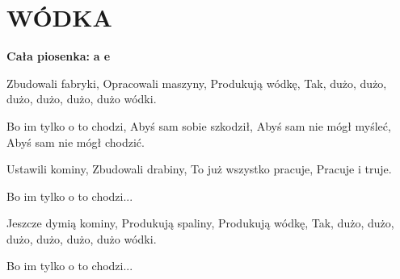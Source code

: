 \documentclass[../../../songbook.tex]{subfiles}
\begin{document}
\TabPositions{8cm} %
\section*{WÓDKA}
{}
\vspace{0.5cm}
\textbf{Cała piosenka: } {\color{red}\textbf{a e} } \newline

Zbudowali fabryki,		 \newline
Opracowali maszyny, \newline
Produkują wódkę, \newline
Tak, dużo, dużo, dużo, dużo, dużo, dużo wódki. \newline

\-\hspace{1cm} Bo im tylko o to chodzi, \newline
\-\hspace{1cm} Abyś sam sobie szkodził, \newline
\-\hspace{1cm} Abyś sam nie mógł myśleć, \newline
\-\hspace{1cm} Abyś sam nie mógł chodzić. \newline

Ustawili kominy, \newline
Zbudowali drabiny, \newline
To już wszystko pracuje, \newline
Pracuje i truje. \newline

\-\hspace{1cm} Bo im tylko o to chodzi... \newline

Jeszcze dymią kominy, \newline
Produkują spaliny, \newline
Produkują wódkę, \newline
Tak, dużo, dużo, dużo, dużo, dużo, dużo wódki.  \newline

\-\hspace{1cm} Bo im tylko o to chodzi... \newline
\end{document}
